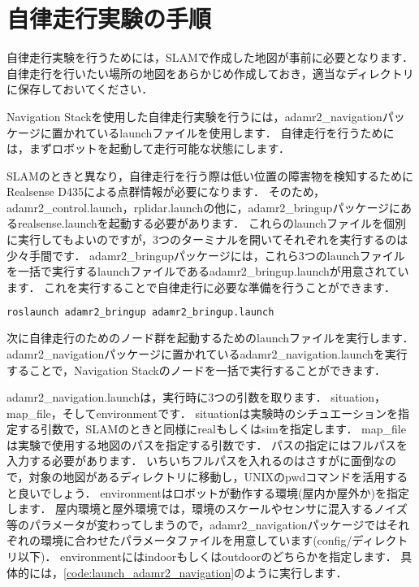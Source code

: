 \documentclass[{../../master}]{subfiles}
\begin{document}
\section{自律走行実験の手順}

自律走行実験を行うためには，SLAMで作成した地図が事前に必要となります．
自律走行を行いたい場所の地図をあらかじめ作成しておき，適当なディレクトリに保存しておいてください．

Navigation Stackを使用した自律走行実験を行うには，\textsf{adamr2\_navigation}パッケージに置かれているlaunchファイルを使用します．
自律走行を行うためには，まずロボットを起動して走行可能な状態にします．

SLAMのときと異なり，自律走行を行う際は低い位置の障害物を検知するためにRealsense D435による点群情報が必要になります．
そのため，\textsf{adamr2\_control.launch}，\textsf{rplidar.launch}の他に，\textsf{adamr2\_bringup}パッケージにある\textsf{realsense.launch}を起動する必要があります．
これらのlaunchファイルを個別に実行してもよいのですが，3つのターミナルを開いてそれぞれを実行するのは少々手間です．
\textsf{adamr2\_bringup}パッケージには，これら3つのlaunchファイルを一括で実行するlaunchファイルである\textsf{adamr2\_bringup.launch}が用意されています．
これを実行することで自律走行に必要な準備を行うことができます．

\begin{lstlisting}[language=sh, label=code:launch_adamr2_bringup, caption=Launch \textsf{adamr2\_bringup.launch}]
roslaunch adamr2_bringup adamr2_bringup.launch
\end{lstlisting}

次に自律走行のためのノード群を起動するためのlaunchファイルを実行します．
\textsf{adamr2\_navigation}パッケージに置かれている\textsf{adamr2\_navigation.launch}を実行することで，Navigation Stackのノードを一括で実行することができます．

\textsf{adamr2\_navigation.launch}は，実行時に3つの引数を取ります．
\textsf{situation}，\textsf{map\_file}，そして\textsf{environment}です．
\textsf{situation}は実験時のシチュエーションを指定する引数で，SLAMのときと同様に\textsf{real}もしくは\textsf{sim}を指定します．
\textsf{map\_file}は実験で使用する地図のパスを指定する引数です．
パスの指定にはフルパスを入力する必要があります．
いちいちフルパスを入れるのはさすがに面倒なので，対象の地図があるディレクトリに移動し，UNIXの\textsf{pwd}コマンドを活用すると良いでしょう．
\textsf{environment}はロボットが動作する環境(屋内か屋外か)を指定します．
屋内環境と屋外環境では，環境のスケールやセンサに混入するノイズ等のパラメータが変わってしまうので，\textsf{adamr2\_navigation}パッケージではそれぞれの環境に合わせたパラメータファイルを用意しています(\textsf{config/}ディレクトリ以下)．
\textsf{environment}には\textsf{indoor}もしくは\textsf{outdoor}のどちらかを指定します．
具体的には，\ref{code:launch_adamr2_navigation}のように実行します．
\end{document}
